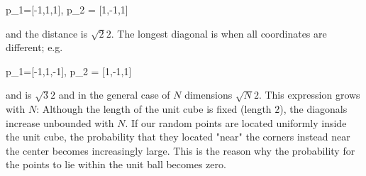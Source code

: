 \bee
p_1=[-1,1,1], \quad p_2 = [1,-1,1]
\eee

and the distance is $\sqrt{2}2$. The longest diagonal is when all coordinates are different; e.g.

\bee
p_1=[-1,1,-1], \quad p_2 = [1,-1,1]
\eee

and is $\sqrt{3}2$ and in the general case of $N$ dimensions $\sqrt{N}2$. This expression grows with $N$: Although the length of the unit cube is fixed (length $2$), the diagonals increase unbounded with $N$. If our random points are located uniformly inside the unit cube, the probability that they located "near" the corners instead near the center becomes increasingly large. This is the reason why the probability for the points to lie within the unit ball becomes zero.


